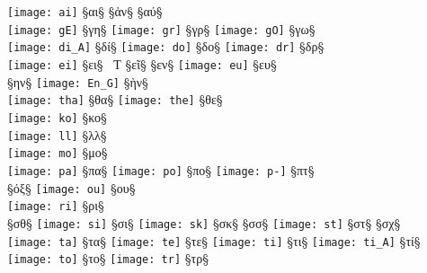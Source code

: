 \begin{liste}

 \texttt{[image: ai]} §{αι}§ \quad
{}  §{ἀν}§ \quad
{} §{αύ}§ \\

\texttt{[image: gE]} §{γη}§ \quad
\texttt{[image: gr]} §{γρ}§ \quad
\texttt{[image: gO]} §{γω}§ \\

\texttt{[image: di\_A]} §{δί}§ \quad
\texttt{[image: do]} §{δο}§ \quad
\texttt{[image: dr]} §{δρ}§ \\

 \texttt{[image: ei]} §{ει}§ \quad
{} \, { \Large Ƭ} §{εῖ}§ \quad
{}  §{εν}§ \quad
{} \texttt{[image: eu]} §{ευ}§ \\

 §{ην}§ \quad
\texttt{[image: En\_G]} §{ὴν}§ \\

\texttt{[image: tha]} §{θα}§ \quad
\texttt{[image: the]} §{θε}§ \\

\texttt{[image: ko]} §{κο}§ \\

 \texttt{[image: ll]} §{λλ}§ \\

\texttt{[image: mo]} §{μο}§ \\

\texttt{[image: pa]} §{πα}§ \quad
\texttt{[image: po]} §{πο}§ \quad
\texttt{[image: p-]} §{πτ}§ \\

{}   §{όξ}§ \quad
{} \texttt{[image: ou]} §{ου}§ \\
 
 \texttt{[image: ri]} §{ρι}§ \\

  §{σθ}§ \quad
\texttt{[image: si]} §{σι}§ \quad
\texttt{[image: sk]} §{σκ}§ \quad
{}  §{σσ}§ \quad
{} \texttt{[image: st]} §{στ}§ \quad
{} §{σχ}§ \\

\texttt{[image: ta]} §{τα}§ \quad
\texttt{[image: te]} §{τε}§ \quad
\texttt{[image: ti]} §{τι}§ \quad
\texttt{[image: ti\_A]} §{τί}§ \quad
\texttt{[image: to]} §{το}§ \quad
\texttt{[image: tr]} §{τρ}§ \\


\end{liste}
